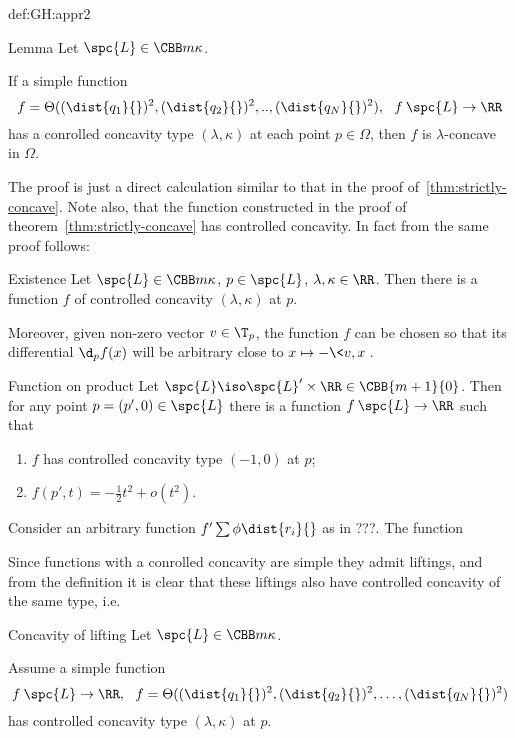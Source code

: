 {\begin{subthm}{def:GH:appr2}
\begin{thm}{Lemma} \label{contr-concave}
Let $\spc{L}\in\CBB m \kappa$.

If a simple function 
$$f=\Theta((\dist{q_1}{})^2,(\dist{q_2}{})^2,..,(\dist{q_N}{})^2),\ \ f\:\spc{L}\to\RR$$ 
has a conrolled concavity type $(\lambda,\kappa)$ at each point $p\in \Omega$, then
$f$ is $\lambda$-concave in $\Omega$. 
\end{thm}

The proof is just a direct calculation similar to that in the proof
of~\ref{thm:strictly-concave}. 
Note also, that the function constructed in the proof of
theorem~\ref{thm:strictly-concave} has controlled concavity.
In fact from the
same proof follows:

\begin{thm}{Existence} \label{exist-control}
Let $\spc{L}\in\CBB m \kappa$, $p\in \spc{L}$, $\lambda,\kappa\in\RR$.
Then there is a function $f$ of controlled concavity $(\lambda,\kappa)$
at $p$.

Moreover, given non-zero vector $v\in \T_p$, 
the function $f$ can be chosen so that its differential $\d_p f(x)$ will be arbitrary close to $x\mapsto -\<v,x\>$.
\end{thm}

\begin{thm}{Function on product}
Let $\spc{L}\iso \spc{L}'\times \RR\in\CBB{m+1}{0}$.
Then for any point $p=(p',0)\in \spc{L}$ there is a function $f\:\spc{L}\to\RR$ such that
\begin{enumerate}
\item $f$ has controlled concavity type $(-1, 0)$ at $p$;
\item $f(p',t)=-\tfrac12t^2+o(t^2)$.
\end{enumerate}
\end{thm}

Consider an arbitrary function $f'\sum\phi\dist{r_i}{}$ as in ???.
The function 

Since functions with a conrolled concavity are simple they admit liftings, and
from the definition it is clear that these liftings also have controlled
concavity of the same type, i.e. 

\begin{thm}{Concavity of lifting} \label{lem:lifting}
Let $\spc{L}\in\CBB m \kappa$.

Assume a simple function 
$$f\:\spc{L}\to \RR,\ \ f=\Theta((\dist{q_1}{})^2,(\dist{q_2}{})^2,\dots,(\dist{q_N}{})^2)$$
has controlled concavity type $(\lambda,\kappa)$ at $p$.


\end{thm}
\end{subthm}}
